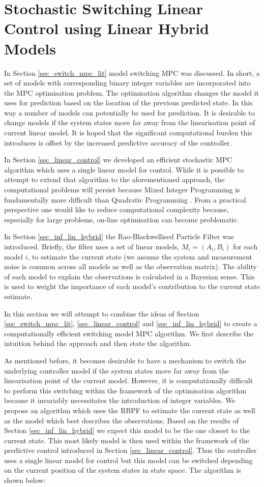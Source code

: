 \chapter{Stochastic Switching Linear Control using Linear Hybrid Models}
\label{sec_rbpf_control}
In Section \ref{sec_switch_mpc_lit} model switching MPC was discussed. In short, a set of models with corresponding binary integer variables are incorporated into the MPC optimisation problem. The optimisation algorithm changes the model it uses for prediction based on the location of the previous predicted state. In this way a number of models can potentially be used for prediction. It is desirable to change models if the system states move far away from the linearisation point of current linear model. It is hoped that the significant computational burden this introduces is offset by the increased predictive accuracy of the controller.

In Section \ref{sec_linear_control} we developed an efficient stochastic MPC algorithm which uses a single linear model for control. While it is possible to attempt to extend that algorithm to the aforementioned approach, the computational problems will persist because Mixed Integer Programming is fundamentally more difficult than Quadratic Programming \cite{forst}. From a practical perspective one would like to reduce computational complexity because, especially for large problems, on-line optimisation can become problematic.

In Section \ref{sec_inf_lin_hybrid} the Rao-Blackwellised Particle Filter was introduced. Briefly, the filter uses a set of linear models, $M_i=(A_i, B_i)$ for each model $i$, to estimate the current state (we assume the system and measurement noise is common across all models as well as the observation matrix). The ability of each model to explain the observations is calculated in a Bayesian sense. This is used to weight the importance of each model's contribution to the current state estimate. 

In this section we will attempt to combine the ideas of Section \ref{sec_switch_mpc_lit}, \ref{sec_linear_control} and \ref{sec_inf_lin_hybrid} to create a computationally efficient switching model MPC algorithm. We first describe the intuition behind the approach and then state the algorithm.

As mentioned before, it becomes desirable to have a mechanism to switch the underlying controller model if the system states move far away from the linearisation point of the current model. However, it is computationally difficult to perform this switching within the framework of the optimisation algorithm because it invariably necessitates the introduction of integer variables. We propose an algorithm which uses the RBPF to estimate the current state as well as the model which best describes the observations. Based on the results of Section \ref{sec_inf_lin_hybrid} we expect this model to be the one closest to the current state. This most likely model is then used within the framework of the predictive control introduced in Section \ref{sec_linear_control}. Thus the controller uses a single linear model for control but this model can be switched depending on the current position of the system states in state space. The algorithm is shown below:

